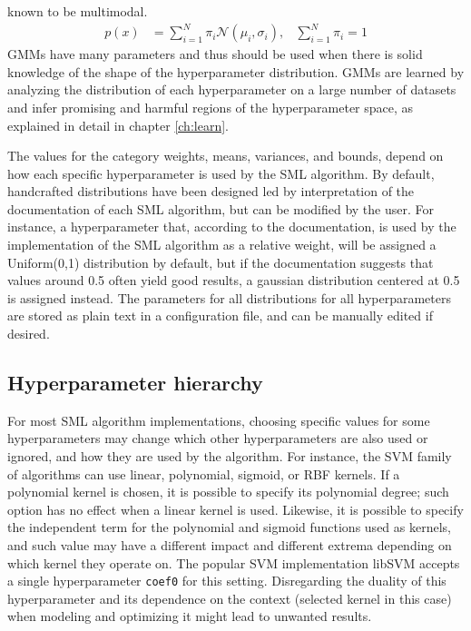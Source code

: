 \begin{itemize}
		known to be multimodal.
		\begin{align}
			p(x) &= \sum_{i=1}^N \pi_i \mathcal{N}(\mu_i, \sigma_i),&\sum_{i=1}^N \pi_i = 1
		\end{align}
		GMMs have many parameters and thus should be used when there is solid knowledge of the
		shape of the hyperparameter distribution. GMMs are learned by analyzing the
		distribution of each hyperparameter on a large number of datasets and infer promising and
		harmful regions of the hyperparameter space, as explained in detail in chapter
		\ref{ch:learn}. 
	\end{itemize}

	The values for the category weights, means, variances, and bounds, depend on how each specific
	hyperparameter is used by the SML algorithm. By default, handcrafted distributions have been designed
	led by interpretation of the documentation of each SML algorithm, but can be modified by the
	user. For
	instance, a hyperparameter that, according to the documentation, is used by the implementation
	of the SML algorithm as a relative weight, will be assigned a Uniform(0,1) distribution by default, but if the
	documentation suggests that values around 0.5 often yield good results, a gaussian distribution
	centered at 0.5 is assigned instead. The parameters for all distributions for all
	hyperparameters are stored as plain text in a configuration file, and can be manually edited if
	desired.

	\subsection{Hyperparameter hierarchy}
	\label{ssec:hyp_hierarchy}
	For most SML algorithm implementations, choosing specific values for some hyperparameters may
	change which other hyperparameters are also used or ignored, and how they are used by the
	algorithm. For instance, the SVM family of algorithms can use linear,
	polynomial, sigmoid, or RBF kernels. If a polynomial kernel is chosen, it is possible to
	specify its polynomial degree; such option has no effect when a linear kernel is used. Likewise,
	it is possible to specify the independent term for the polynomial and sigmoid functions used as
	kernels, and such value may have a different impact and different extrema depending on which
	kernel they operate on. The popular SVM implementation libSVM accepts a single hyperparameter
	\texttt{coef0} for this setting. Disregarding the duality of this hyperparameter and its
	dependence on the context (selected kernel in this case) when modeling and optimizing it might
	lead to unwanted results.

